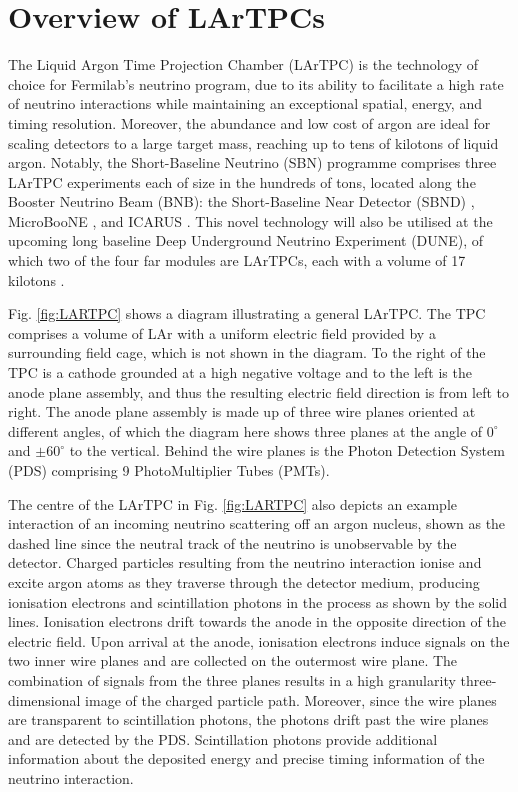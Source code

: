 \section{Overview of LArTPCs}
\label{sec3:overview}
The Liquid Argon Time Projection Chamber (LArTPC) is the technology of choice for Fermilab's neutrino program, due to its ability to facilitate a high rate of neutrino interactions while maintaining an exceptional spatial, energy, and timing resolution. 
Moreover, the abundance and low cost of argon are ideal for scaling detectors to a large target mass, reaching up to tens of kilotons of liquid argon.
Notably, the Short-Baseline Neutrino (SBN) programme \cite{SBNProgram} comprises three LArTPC experiments each of size in the hundreds of tons, located along the Booster Neutrino Beam (BNB): the Short-Baseline Near Detector (SBND) \cite{sbnd_det}, MicroBooNE \cite{ubooneDet}, and ICARUS \cite{icarus_det}.
This novel technology will also be utilised at the upcoming long baseline Deep Underground Neutrino Experiment (DUNE), of which two of the four far modules are LArTPCs, each with a volume of 17 kilotons \cite{dunefd_det}.

Fig. \ref{fig:LARTPC} shows a diagram illustrating a general LArTPC.
The TPC comprises a volume of LAr with a uniform electric field provided by a surrounding field cage, which is not shown in the diagram.
To the right of the TPC is a cathode grounded at a high negative voltage and to the left is the anode plane assembly, and thus the resulting electric field direction is from left to right.
The anode plane assembly is made up of three wire planes oriented at different angles, of which the diagram here shows three planes at the angle of $0^{\circ}$ and $\pm60^{\circ}$ to the vertical.
Behind the wire planes is the Photon Detection System (PDS) comprising 9 PhotoMultiplier Tubes (PMTs).   

The centre of the LArTPC in Fig. \ref{fig:LARTPC} also depicts an example interaction of an incoming neutrino scattering off an argon nucleus, shown as the dashed line since the neutral track of the neutrino is unobservable by the detector.
Charged particles resulting from the neutrino interaction ionise and excite argon atoms as they traverse through the detector medium, producing ionisation electrons and scintillation photons in the process as shown by the solid lines.
Ionisation electrons drift towards the anode in the opposite direction of the electric field.
Upon arrival at the anode, ionisation electrons induce signals on the two inner wire planes and are collected on the outermost wire plane.
The combination of signals from the three planes results in a high granularity three-dimensional image of the charged particle path.
Moreover, since the wire planes are transparent to scintillation photons, the photons drift past the wire planes and are detected by the PDS.
Scintillation photons provide additional information about the deposited energy and precise timing information of the neutrino interaction.

